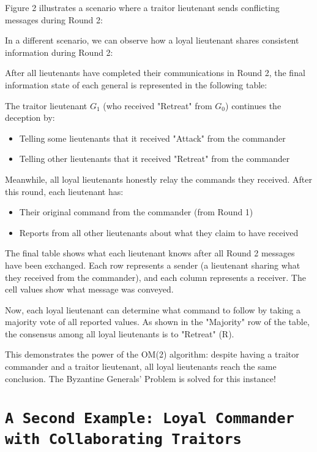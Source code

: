 \documentclass[11pt]{article}
\newcommand{\gen}[1]{\ensuremath{G_{#1}}}
\begin{document}
Figure 2 illustrates a scenario where a traitor lieutenant sends conflicting messages during Round 2:



In a different scenario, we can observe how a loyal lieutenant shares consistent information during Round 2:



After all lieutenants have completed their communications in Round 2, the final information state of each general is represented in the following table:



The traitor lieutenant $\gen{1}$ (who received "Retreat" from $\gen{0}$) continues the deception by:
\begin{itemize}
    \item Telling some lieutenants that it received "Attack" from the commander
    \item Telling other lieutenants that it received "Retreat" from the commander
\end{itemize}

Meanwhile, all loyal lieutenants honestly relay the commands they received. After this round, each lieutenant has:
\begin{itemize}
    \item Their original command from the commander (from Round 1)
    \item Reports from all other lieutenants about what they claim to have received
\end{itemize}

The final table shows what each lieutenant knows after all Round 2 messages have been exchanged. Each row represents a sender (a lieutenant sharing what they received from the commander), and each column represents a receiver. The cell values show what message was conveyed.

Now, each loyal lieutenant can determine what command to follow by taking a majority vote of all reported values. As shown in the "Majority" row of the table, the consensus among all loyal lieutenants is to "Retreat" (R).

This demonstrates the power of the OM(2) algorithm: despite having a traitor commander and a traitor lieutenant, all loyal lieutenants reach the same conclusion. The Byzantine Generals' Problem is solved for this instance!

\section*{\texttt{\Large A Second Example: Loyal Commander with Collaborating Traitors}}
\end{document}
